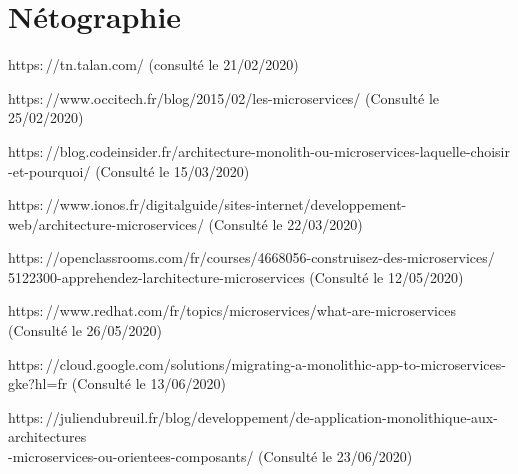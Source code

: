 \chapter*{Nétographie}



\begin{enumerate}[label={[\arabic*]}]
    \item https$:$//tn.talan.com/ (consulté le 21/02/2020)
    \item https$:$//www.occitech.fr/blog/2015/02/les-microservices/ (Consulté le 25/02/2020)
    \item https$:$//blog.codeinsider.fr/architecture-monolith-ou-microservices-laquelle-choisir\\-et-pourquoi/ (Consulté le 15/03/2020)
    \item https$:$//www.ionos.fr/digitalguide/sites-internet/developpement-web/architecture-microservices/ (Consulté le 22/03/2020)
    \item https$:$//openclassrooms.com/fr/courses/4668056-construisez-des-microservices/\\5122300-apprehendez-larchitecture-microservices (Consulté le 12/05/2020)
    \item https$:$//www.redhat.com/fr/topics/microservices/what-are-microservices (Consulté le 26/05/2020)
   \item https$:$//cloud.google.com/solutions/migrating-a-monolithic-app-to-microservices-gke?hl=fr (Consulté le 13/06/2020)
   \item https$:$//juliendubreuil.fr/blog/developpement/de-application-monolithique-aux-architectures\\-microservices-ou-orientees-composants/ (Consulté le 23/06/2020)
\end{enumerate}

   

